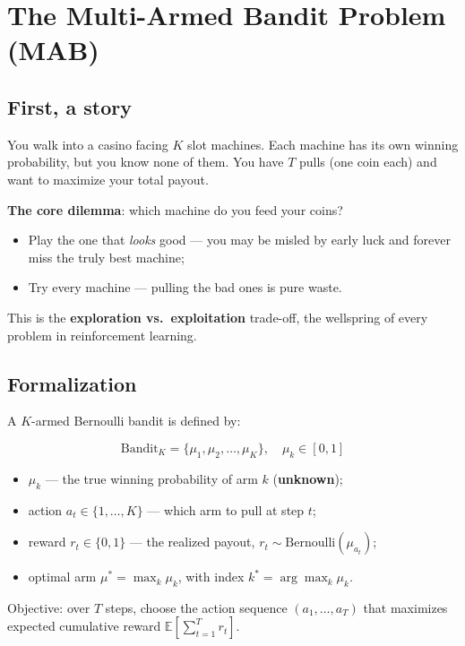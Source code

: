 \documentclass{article}
\begin{document}
\section*{The Multi-Armed Bandit Problem (MAB)}

\subsection*{First, a story}

You walk into a casino facing $K$ slot machines. Each machine has its own winning probability, but you know none of them. You have $T$ pulls (one coin each) and want to maximize your total payout.

\textbf{The core dilemma}: which machine do you feed your coins?
\begin{itemize}
  \item Play the one that \emph{looks} good --- you may be misled by early luck and forever miss the truly best machine;
  \item Try every machine --- pulling the bad ones is pure waste.
\end{itemize}

This is the \textbf{exploration vs.\ exploitation} trade-off, the wellspring of every problem in reinforcement learning.

\subsection*{Formalization}

A $K$-armed Bernoulli bandit is defined by:

\[
\boxed{\text{Bandit}_K = \{\mu_1, \mu_2, \ldots, \mu_K\}, \quad \mu_k \in [0,1]}
\]

\begin{itemize}
  \item $\mu_k$ --- the true winning probability of arm $k$ (\textbf{unknown});
  \item action $a_t \in \{1,\ldots,K\}$ --- which arm to pull at step $t$;
  \item reward $r_t \in \{0,1\}$ --- the realized payout, $r_t \sim \text{Bernoulli}(\mu_{a_t})$;
  \item optimal arm $\mu^* = \max_k \mu_k$, with index $k^* = \arg\max_k \mu_k$.
\end{itemize}

Objective: over $T$ steps, choose the action sequence $(a_1,\ldots,a_T)$ that maximizes expected cumulative reward $\mathbb{E}\left[\sum_{t=1}^{T} r_t\right]$.
\end{document}
